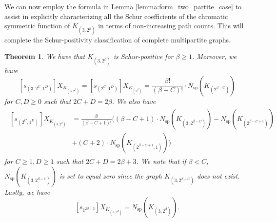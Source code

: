 \documentclass[12pt]{amsart}
\numberwithin{equation}{section}
\theoremstyle{plain}
\newtheorem{theorem}[equation]{Theorem}
\theoremstyle{definition}
\theoremstyle{remark}
\begin{document}
We can now employ the formula in Lemma \ref{lemma:form_two_partite_case} to assist in explicitly characterizing all the Schur coefficients of the chromatic symmetric function of $K_{(3,2^{\beta})}$ in terms of non-increasing path counts. This will complete the Schur-positivity 
classification of complete multipartite graphs. 


\begin{theorem}
\label{thm:K32_s_pos}
 We have that $K_{(3,2^{\beta})}$ is Schur-positive for $\beta\ge 1$. Moreover, we have
\begin{equation}
\label{eq:target_coeff_first}
[s_{(3,2^C,1^D)}]X_{K_{(3,2^{\beta})}}=[s_{(2^C,1^D)}]X_{K_{(2^{\beta})}}=\frac{\beta !}{(\beta-C)!}\cdot N_{\mathrm{sp}}(K_{(2^{\beta-C})})
\end{equation}
for $C,D\ge 0$ such that $2C+D=2\beta$. We also have
\begin{align}
\begin{split}
\label{eq:target_coeff_second}
[s_{(2^C,1^D)}]X_{K_{(3,2^{\beta})}}&=\frac{\beta !}{(\beta - C+1)!} \Big((\beta-C+1)\cdot N_{\mathrm{sp}}(K_{(3,2^{\beta-C})})-N_{\mathrm{sp}}(K_{(2^{\beta-C+1})})\\
&+(C+2)\cdot N_{\mathrm{sp}}(K_{(2^{\beta-C+1},1)})\Big)
\end{split}
\end{align}
for $C\ge 1,D\ge 1$ such that $2C+D=2\beta+3$. We note that if $\beta<C$, $N_{\mathrm{sp}}(K_{(3,2^{\beta-C})})$ is set to equal zero since the graph $K_{(3,2^{\beta-C})}$ does not exist. Lastly, we have
\begin{equation}
\label{eq:target_coeff_third}
[s_{1^{2\beta+3}}]X_{K_{(3,2^{\beta})}}=N_{\mathrm{sp}}(K_{(3,2^{\beta})}).
\end{equation}
\end{theorem}
\end{document}
